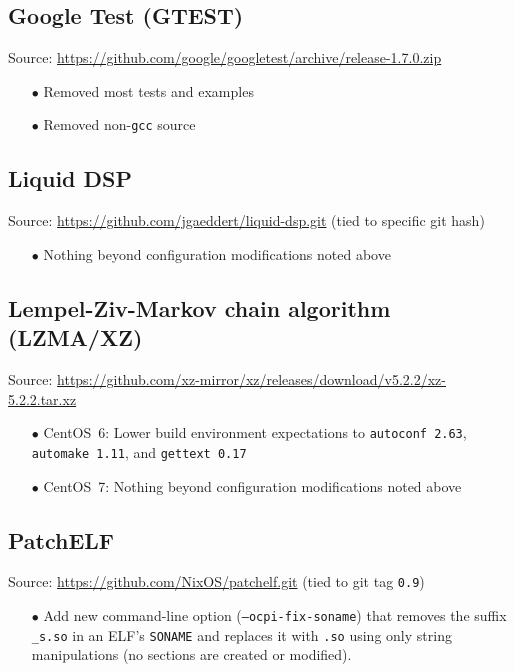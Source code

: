 \begin{appendices}
\subsection{Google Test (GTEST)}
\label{App:gtest}
Source: \url{https://github.com/google/googletest/archive/release-1.7.0.zip}
\begin{enumerate}
\item[$\bullet$] Removed most tests and examples
\item[$\bullet$] Removed non-\texttt{gcc} source
\end{enumerate}

\subsection{Liquid DSP}
Source: \url{https://github.com/jgaeddert/liquid-dsp.git} (tied to specific git hash)
\label{App:liquid}
\begin{enumerate}
\item[$\bullet$] Nothing beyond configuration modifications noted above
\end{enumerate}

\subsection{Lempel-Ziv-Markov chain algorithm (LZMA/XZ)}
Source: \url{https://github.com/xz-mirror/xz/releases/download/v5.2.2/xz-5.2.2.tar.xz}
\label{App:xz}
\begin{enumerate}
\item[$\bullet$] CentOS~6: Lower build environment expectations to \texttt{autoconf 2.63}, \texttt{automake 1.11}, and \texttt{gettext 0.17}
\item[$\bullet$] CentOS~7: Nothing beyond configuration modifications noted above
\end{enumerate}

\subsection{PatchELF}
Source: \url{https://github.com/NixOS/patchelf.git} (tied to git tag \texttt{0.9})
\label{App:patchelf}
\begin{enumerate}
\item[$\bullet$] Add new command-line option (\texttt{--ocpi-fix-soname}) that removes the suffix \verb+_s.so+ in an ELF's \texttt{SONAME} and replaces it with \verb+.so+ using only string manipulations (no sections are created or modified).
\end{enumerate}


\end{appendices}
